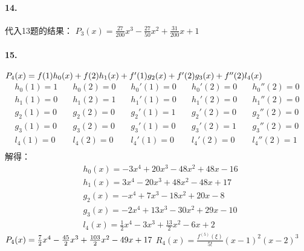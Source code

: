 \documentclass[UTF8]{ctexart}
\begin{document}
	\paragraph{14.}
		代入13题的结果：
		$P_3(x)=\frac{27}{200}x^3-\frac{27}{50}x^2+\frac{31}{200}x+1$
	
	\paragraph{15.}
		$P_4(x)=f(1)h_0(x)+f(2)h_1(x)+f'(1)g_2(x)+f'(2)g_3(x)+f''(2)l_4(x)\\$
		\begin{displaymath}
		\begin{aligned}
			h_0(1)=1\quad&h_0(2)=0\quad&h_0'(1)=0\quad&h_0'(2)=0\quad&h_0''(2)=0\\
			h_1(1)=0\quad&h_1(2)=1\quad&h_1'(1)=0\quad&h_1'(2)=0\quad&h_1''(2)=0\\
			g_2(1)=0\quad&g_2(2)=0\quad&g_2'(1)=1\quad&g_2'(2)=0\quad&g_2''(2)=0\\
			g_3(1)=0\quad&g_3(2)=0\quad&g_3'(1)=0\quad&g_3'(2)=1\quad&g_3''(2)=0\\
			l_4(1)=0\quad&l_4(2)=0\quad&l_4'(1)=0\quad&l_4'(2)=0\quad&l_4''(2)=1\\
		\end{aligned}
		\end{displaymath}
		解得：
		\begin{displaymath}
		\begin{aligned}
			&h_0(x)=-3x^4+20x^3-48x^2+48x-16\\
			&h_1(x)=3x^4-20x^3+48x^2-48x+17\\
			&g_2(x)=-x^4+7x^3-18x^2+20x-8\\
			&g_3(x)=-2x^4+13x^3-30x^2+29x-10\\
			&l_4(x)=\frac{1}{2}x^4-3x^3+\frac{13}{2}x^2-6x+2
		\end{aligned}
		\end{displaymath}
		$P_4(x)=\frac{7}{2}x^4-\frac{45}{2}x^3+\frac{103}{2}x^2-49x+17\\$
		$R_4(x)=\frac{f^(5)(\xi)}{5!}(x-1)^2(x-2)^3$
		
\end{document}
